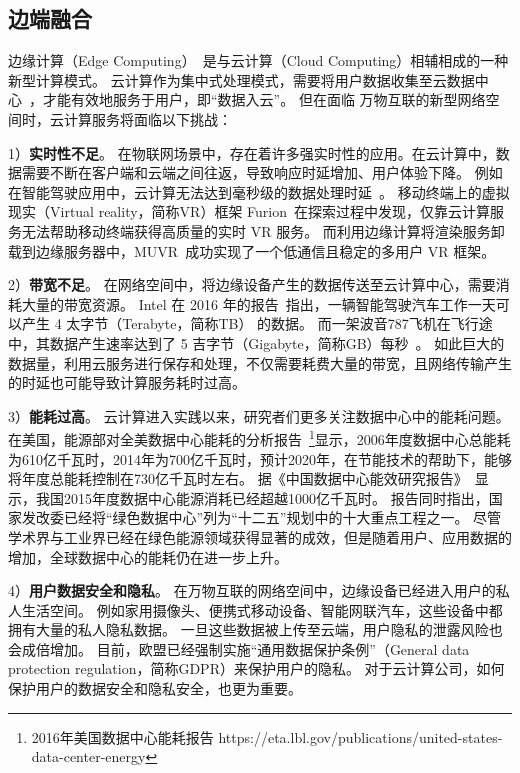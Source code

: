 \subsection{边端融合}
边缘计算（Edge Computing）~\cite{DBLP:journals/cacm/ArmbrustFGJKKLPRSZ10}是与云计算（Cloud Computing）相辅相成的一种新型计算模式。
云计算作为集中式处理模式，需要将用户数据收集至云数据中心~\cite{DBLP:conf/icdcs/Montresor16}，才能有效地服务于用户，即“数据入云”。
但在面临 万物互联的新型网络空间时，云计算服务将面临以下挑战：

1）\textbf{实时性不足}。
在物联网场景中，存在着许多强实时性的应用。在云计算中，数据需要不断在客户端和云端之间往返，导致响应时延增加、用户体验下降。
例如在智能驾驶应用中，云计算无法达到毫秒级的数据处理时延~\cite{DBLP:conf/cvpr/GeigerLU12}。
移动终端上的虚拟现实（Virtual reality，简称VR）框架 Furion~\cite{DBLP:conf/mobicom/LaiHCSD17}在探索过程中发现，仅靠云计算服务无法帮助移动终端获得高质量的实时 VR 服务。
而利用边缘计算将渲染服务卸载到边缘服务器中，MUVR~\cite{DBLP:conf/edge/LiG18}成功实现了一个低通信且稳定的多用户 VR 框架。

2）\textbf{带宽不足}。
在网络空间中，将边缘设备产生的数据传送至云计算中心，需要消耗大量的带宽资源。
Intel 在 2016 年的报告~\cite{DBLP:journals/micro/KatoTINTH15}指出，一辆智能驾驶汽车工作一天可以产生 4 太字节（Terabyte，简称TB） 的数据。
而一架波音787飞机在飞行途中，其数据产生速率达到了 5 吉字节（Gigabyte，简称GB）每秒~\cite{JCRD/shi17}。
如此巨大的数据量，利用云服务进行保存和处理，不仅需要耗费大量的带宽，且网络传输产生的时延也可能导致计算服务耗时过高。

3）\textbf{能耗过高}。
云计算进入实践以来，研究者们更多关注数据中心中的能耗问题。
在美国，能源部对全美数据中心能耗的分析报告~\footnote{2016年美国数据中心能耗报告 https://eta.lbl.gov/publications/united-states-data-center-energy}显示，2006年度数据中心总能耗为610亿千瓦时，2014年为700亿千瓦时，预计2020年，在节能技术的帮助下，能够将年度总能耗控制在730亿千瓦时左右。
据《中国数据中心能效研究报告》~\cite{whitebooks/cn15}显示，我国2015年度数据中心能源消耗已经超越1000亿千瓦时。
报告同时指出，国家发改委已经将“绿色数据中心”列为“十二五”规划中的十大重点工程之一。
尽管学术界与工业界已经在绿色能源领域获得显著的成效，但是随着用户、应用数据的增加，全球数据中心的能耗仍在进一步上升。

4）\textbf{用户数据安全和隐私}。
在万物互联的网络空间中，边缘设备已经进入用户的私人生活空间。
例如家用摄像头、便携式移动设备、智能网联汽车，这些设备中都拥有大量的私人隐私数据。
一旦这些数据被上传至云端，用户隐私的泄露风险也会成倍增加。
目前，欧盟已经强制实施“通用数据保护条例”（General data protection regulation，简称GDPR）来保护用户的隐私。
对于云计算公司，如何保护用户的数据安全和隐私安全，也更为重要。

